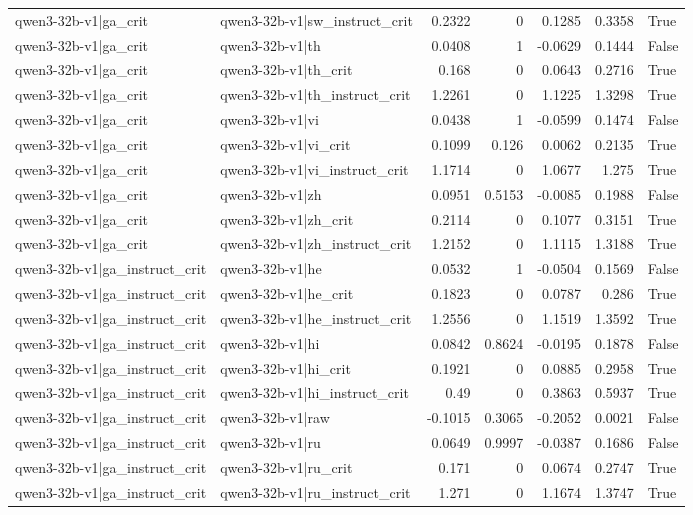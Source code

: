 \begin{table}
\begin{tabular}{l l r r r r l}
qwen3-32b-v1|ga_crit & qwen3-32b-v1|sw_instruct_crit & 0.2322 & 0 & 0.1285 & 0.3358 & True \\
qwen3-32b-v1|ga_crit & qwen3-32b-v1|th & 0.0408 & 1 & -0.0629 & 0.1444 & False \\
qwen3-32b-v1|ga_crit & qwen3-32b-v1|th_crit & 0.168 & 0 & 0.0643 & 0.2716 & True \\
qwen3-32b-v1|ga_crit & qwen3-32b-v1|th_instruct_crit & 1.2261 & 0 & 1.1225 & 1.3298 & True \\
qwen3-32b-v1|ga_crit & qwen3-32b-v1|vi & 0.0438 & 1 & -0.0599 & 0.1474 & False \\
qwen3-32b-v1|ga_crit & qwen3-32b-v1|vi_crit & 0.1099 & 0.126 & 0.0062 & 0.2135 & True \\
qwen3-32b-v1|ga_crit & qwen3-32b-v1|vi_instruct_crit & 1.1714 & 0 & 1.0677 & 1.275 & True \\
qwen3-32b-v1|ga_crit & qwen3-32b-v1|zh & 0.0951 & 0.5153 & -0.0085 & 0.1988 & False \\
qwen3-32b-v1|ga_crit & qwen3-32b-v1|zh_crit & 0.2114 & 0 & 0.1077 & 0.3151 & True \\
qwen3-32b-v1|ga_crit & qwen3-32b-v1|zh_instruct_crit & 1.2152 & 0 & 1.1115 & 1.3188 & True \\
qwen3-32b-v1|ga_instruct_crit & qwen3-32b-v1|he & 0.0532 & 1 & -0.0504 & 0.1569 & False \\
qwen3-32b-v1|ga_instruct_crit & qwen3-32b-v1|he_crit & 0.1823 & 0 & 0.0787 & 0.286 & True \\
qwen3-32b-v1|ga_instruct_crit & qwen3-32b-v1|he_instruct_crit & 1.2556 & 0 & 1.1519 & 1.3592 & True \\
qwen3-32b-v1|ga_instruct_crit & qwen3-32b-v1|hi & 0.0842 & 0.8624 & -0.0195 & 0.1878 & False \\
qwen3-32b-v1|ga_instruct_crit & qwen3-32b-v1|hi_crit & 0.1921 & 0 & 0.0885 & 0.2958 & True \\
qwen3-32b-v1|ga_instruct_crit & qwen3-32b-v1|hi_instruct_crit & 0.49 & 0 & 0.3863 & 0.5937 & True \\
qwen3-32b-v1|ga_instruct_crit & qwen3-32b-v1|raw & -0.1015 & 0.3065 & -0.2052 & 0.0021 & False \\
qwen3-32b-v1|ga_instruct_crit & qwen3-32b-v1|ru & 0.0649 & 0.9997 & -0.0387 & 0.1686 & False \\
qwen3-32b-v1|ga_instruct_crit & qwen3-32b-v1|ru_crit & 0.171 & 0 & 0.0674 & 0.2747 & True \\
qwen3-32b-v1|ga_instruct_crit & qwen3-32b-v1|ru_instruct_crit & 1.271 & 0 & 1.1674 & 1.3747 & True \\

\end{tabular}
\end{table}

